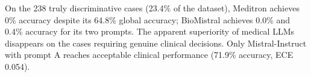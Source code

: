 %

\begin{finding}
    On the 238 truly discriminative cases (23.4\% of the dataset), Meditron
    achieves 0\% accuracy despite its 64.8\% global accuracy; BioMistral
    achieves 0.0\% and 0.4\% accuracy for its two prompts. The apparent
    superiority of medical LLMs disappears on the cases requiring genuine
    clinical decisions. Only Mistral-Instruct with prompt A reaches
    acceptable clinical performance (71.9\% accuracy, ECE 0.054).
\end{finding}

